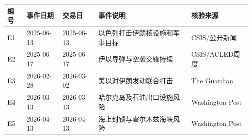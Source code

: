 \begin{tabular}{lllll}
\toprule
编号 & 事件日期 & 交易日 & 事件说明 & 核验来源 \\
\midrule
E1 & 2025-06-13 & 2025-06-13 & 以色列打击伊朗核设施和军事目标 & CSIS/公开新闻 \\
E2 & 2025-06-17 & 2025-06-17 & 伊以导弹与空袭交锋持续 & CSIS/ACLED周度 \\
E3 & 2026-02-28 & 2026-03-02 & 美以对伊朗发动联合打击 & The Guardian \\
E4 & 2026-03-13 & 2026-03-13 & 哈尔克岛及石油出口设施风险 & Washington Post \\
E5 & 2026-04-13 & 2026-04-13 & 海上封锁与霍尔木兹海峡风险 & Washington Post \\
\bottomrule
\end{tabular}
